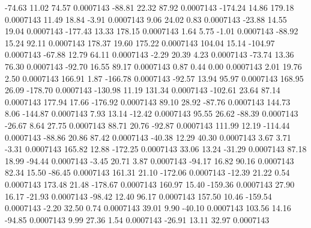       -74.63       11.02       74.57     0.0007143
      -88.81       22.32       87.92     0.0007143
     -174.24       14.86      179.18     0.0007143
       11.49       18.84       -3.91     0.0007143
        9.06       24.02        0.83     0.0007143
      -23.88       14.55       19.04     0.0007143
     -177.43       13.33      178.15     0.0007143
        1.64        5.75       -1.01     0.0007143
      -88.92       15.24       92.11     0.0007143
      178.37       19.60      175.22     0.0007143
      104.04       15.14     -104.97     0.0007143
      -67.88       12.79       64.11     0.0007143
       -2.29       20.39        4.23     0.0007143
      -73.74       13.36       76.30     0.0007143
      -92.70       16.55       89.17     0.0007143
        0.87        0.44        0.00     0.0007143
        2.01       19.76        2.50     0.0007143
      166.91        1.87     -166.78     0.0007143
      -92.57       13.94       95.97     0.0007143
      168.95       26.09     -178.70     0.0007143
     -130.98       11.19      131.34     0.0007143
     -102.61       23.64       87.14     0.0007143
      177.94       17.66     -176.92     0.0007143
       89.10       28.92      -87.76     0.0007143
      144.73        8.06     -144.87     0.0007143
        7.93       13.14      -12.42     0.0007143
       95.55       26.62      -88.39     0.0007143
      -26.67        8.64       27.75     0.0007143
       88.71       20.76      -92.87     0.0007143
      111.99       12.19     -114.44     0.0007143
      -88.86       20.86       87.42     0.0007143
      -40.38       12.29       40.30     0.0007143
        3.67        3.71       -3.31     0.0007143
      165.82       12.88     -172.25     0.0007143
       33.06       13.24      -31.29     0.0007143
       87.18       18.99      -94.44     0.0007143
       -3.45       20.71        3.87     0.0007143
      -94.17       16.82       90.16     0.0007143
       82.34       15.50      -86.45     0.0007143
      161.31       21.10     -172.06     0.0007143
      -12.39       21.22        0.54     0.0007143
      173.48       21.48     -178.67     0.0007143
      160.97       15.40     -159.36     0.0007143
       27.90       16.17      -21.93     0.0007143
      -98.42       12.40       96.17     0.0007143
      157.50       10.46     -159.54     0.0007143
       -2.20       32.50        0.74     0.0007143
       39.01        9.90      -40.10     0.0007143
      103.56       14.16      -94.85     0.0007143
        9.99       27.36        1.54     0.0007143
      -26.91       13.11       32.97     0.0007143
